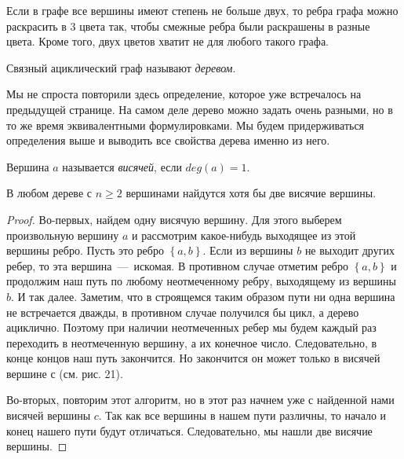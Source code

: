 \begin{consequence}
	Если в графе все вершины имеют степень не больше двух, то ребра графа можно раскрасить в $3$ цвета так, чтобы смежные ребра были раскрашены в разные цвета. Кроме того, двух цветов хватит не для любого такого графа.
\end{consequence}

\newpage
{}

\begin{definition}
	Связный ациклический граф называют \emph{деревом}.
\end{definition}

	Мы не спроста повторили здесь определение, которое уже встречалось на предыдущей странице. На самом деле дерево можно задать очень разными, но в то же время эквивалентными формулировками. Мы будем придерживаться определения выше и выводить все свойства дерева именно из него.

\begin{definition}
	Вершина $a$ называется \emph{висячей}, если $deg(a) = 1$.
\end{definition}

\begin{lemma}
	В любом дереве с $n \geqslant 2$ вершинами найдутся хотя бы две висячие вершины.
	
\begin{proof}	
	 Во-первых, найдем одну висячую вершину. Для этого выберем произвольную вершину $a$ и рассмотрим какое-нибудь выходящее из этой вершины ребро. Пусть это ребро $\left\lbrace a, b \right\rbrace$. Если из вершины $b$ не выходит других ребер, то эта вершина~---~искомая. В противном случае отметим ребро $\left\lbrace a, b \right\rbrace$ и продолжим наш путь по любому неотмеченному ребру, выходящему из вершины $b$. И так далее. Заметим, что в строящемся таким образом пути ни одна вершина не встречается дважды, в противном случае получился бы цикл, а дерево ациклично. Поэтому при наличии неотмеченных ребер мы будем каждый раз переходить в неотмеченную вершину, а их конечное число. Следовательно, в конце концов наш путь закончится. Но закончится он может только в висячей вершине $с$ (см. рис. 21). 
	
	Во-вторых, повторим этот алгоритм, но в этот раз начнем уже с найденной нами висячей вершины $c$. Так как все вершины в нашем пути различны, то начало и конец нашего пути будут отличаться. Следовательно, мы нашли две висячие вершины.
\end{proof}
\end{lemma}

